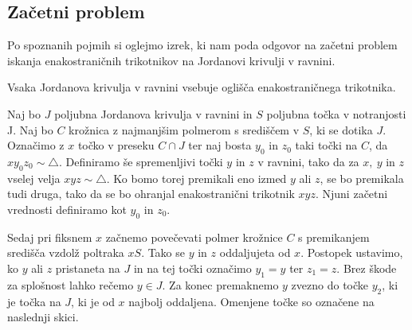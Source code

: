 \documentclass[mat1]{fmfdelo}
\begin{document}
\subsection{Začetni problem}
Po spoznanih pojmih si oglejmo izrek, ki nam poda odgovor na začetni problem iskanja enakostraničnih trikotnikov na Jordanovi krivulji v ravnini.
\begin{izrek}\label{izr:zacetni}
Vsaka Jordanova krivulja v ravnini vsebuje oglišča enakostraničnega trikotnika.
\end{izrek}
\proof
Naj bo $J$ poljubna Jordanova krivulja v ravnini in $S$ poljubna točka v notranjosti J. Naj bo $C$ krožnica z najmanjšim polmerom s središčem v $S$, ki se dotika $J$. Označimo z $x$ točko v preseku $C \cap J$ ter naj bosta $y_0$ in $z_0$ taki točki na $C$, da $xy_0z_0 \sim \triangle$. Definiramo še spremenljivi točki $y$ in $z$ v ravnini, tako da za $x,\ y$ in $z$ vselej velja $xyz \sim \triangle$. Ko bomo torej premikali eno izmed $y$ ali $z$, se bo premikala tudi druga, tako da se bo ohranjal enakostranični trikotnik $xyz$. Njuni začetni vrednosti definiramo kot $y_0$ in $z_0$.

Sedaj pri fiksnem $x$ začnemo povečevati polmer krožnice $C$ s premikanjem središča vzdolž poltraka $xS$. Tako se $y$ in $z$ oddaljujeta od $x$. Postopek ustavimo, ko $y$ ali $z$ pristaneta na $J$ in na tej točki označimo $y_1 = y$ ter $z_1 = z$. Brez škode za splošnost lahko rečemo $y \in J$. Za konec premaknemo $y$ zvezno do točke $y_2$, ki je točka na $J$, ki je od $x$ najbolj oddaljena. Omenjene točke so označene na naslednji skici.

\begin{center}
\end{center}
\end{document}
